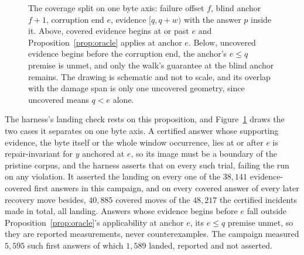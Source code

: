 \documentclass[11pt,a4paper]{article}
\theoremstyle{definition}
\theoremstyle{plain}
\theoremstyle{remark}
\begin{document}
\begin{figure}[!htbp]
\caption{The coverage split on one byte axis: failure offset $f$, blind anchor $f{+}1$, corruption end $e$, evidence
$[q, q{+}w)$ with the answer $p$ inside it. Above, covered evidence begins at or past $e$ and
Proposition~\ref{prop:oracle} applies at anchor $e$. Below, uncovered evidence begins before the corruption end, the
anchor's $e \le q$ premise is unmet, and only the walk's guarantee at the blind anchor remains. The drawing is schematic
and not to scale, and its overlap with the damage span is only one uncovered geometry, since uncovered means $q < e$
alone.}
\label{fig:interval}
\end{figure}

The harness's landing check rests on this proposition, and Figure~\ref{fig:interval} draws the two cases it separates on
one byte axis. A certified answer whose supporting evidence, the byte itself or the whole window occurrence, lies at or
after $e$ is repair-invariant for $y$ anchored at $e$, so its image must be a boundary of the pristine corpus, and the
harness asserts that on every such trial, failing the run on any violation. It asserted the landing on every one of the
$38{,}141$ evidence-covered first answers in this campaign, and on every covered answer of every later recovery move
besides, $40{,}885$ covered moves of the $48{,}217$ the certified incidents made in total, all landing. Answers whose
evidence begins before $e$ fall outside Proposition~\ref{prop:oracle}'s applicability at anchor $e$, its $e \le q$
premise unmet, so they are reported measurements, never counterexamples. The campaign measured $5{,}595$ such first
answers of which $1{,}589$ landed, reported and not asserted.
\end{document}
